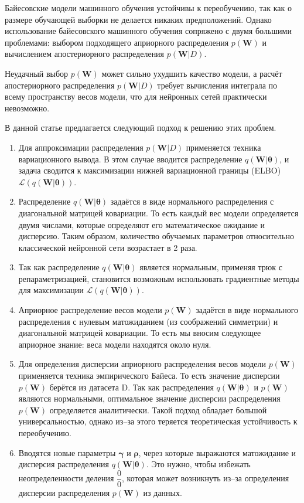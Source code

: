 \documentclass{article}
\begin{document}
Байесовские модели машинного обучения устойчивы к переобучению, так как о размере обучающей выборки не делается никаких предположений.
Однако использование байесовского машинного обучения сопряжено с двумя большими проблемами: выбором подходящего априорного распределения $p(\mathbf{W})$ и вычислением апостериорного распределения $p(\mathbf{W}| D)$.

Неудачный выбор $p(\mathbf{W})$ может сильно ухудшить качество модели, а расчёт апостериорного распределения $p(\mathbf{W}| D)$ требует вычисления интеграла по всему пространству весов модели, что для нейронных сетей практически невозможно.

В данной статье предлагается следующий подход к решению этих проблем.

\begin{enumerate}
 \item Для аппроксимации распределения $p(\mathbf{W}| D)$ применяется техника вариационного вывода.
 В этом случае вводится распределение $q(\mathbf{W} | \pmb{\theta})$, и задача сводится к максимизации нижней вариационной границы (ELBO) $\mathcal{L}(q(\mathbf{W} | \pmb{\theta}))$.
 \item Распределение $q(\mathbf{W} | \pmb{\theta})$
 задаётся в виде нормального распределения с диагональной матрицей ковариации.
 То есть каждый вес модели определяется двумя числами, которые определяют его математическое ожидание и дисперсию.
 Таким образом, количество обучаемых параметров относительно классической нейронной сети возрастает в 2 раза.
 \item Так как распределение $q(\mathbf{W} | \pmb{\theta})$ является нормальным, применяя трюк с репараметризацией, становится возможным использовать градиентные методы для максимизации $\mathcal{L}(q(\mathbf{W} | \pmb{\theta}))$.
 \item Априорное распределение весов модели $p(\mathbf{W})$ задаётся в виде нормального распределения
 с нулевым матожиданием (из соображений симметрии) и диагональной матрицей ковариации. То есть мы вносим следующее априорное знание: веса модели находятся около нуля.
 \item Для определения дисперсии априорного распределения весов модели $p(\mathbf{W})$ применяется техника эмпирического Байеса. То есть значение дисперсии $p(\mathbf{W})$ берётся из датасета D. Так как распределения $q(\mathbf{W} | \pmb{\theta})$ и $p(\mathbf{W})$ являются нормальными, оптимальное значение дисперсии распределения $p(\mathbf{W})$ определяется аналитически. Такой подход обладает большой универсальностью, однако из--за этого теряется теоретическая устойчивость к переобучению.
 \item Вводятся новые параметры $\pmb{\gamma}$ и $\pmb{\rho}$,
 через которые выражаются матожидание и дисперсия распределения $q(\mathbf{W} | \pmb{\theta})$.
 Это нужно, чтобы избежать неопределенности деления $\dfrac{0}{0}$, которая может возникнуть из--за определения дисперсии распределения $p(\mathbf{W})$ из данных.
\end{enumerate}
\end{document}
